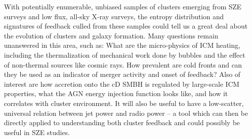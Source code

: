 \documentclass[11pt]{article}
\begin{document}
With potentially enumerable, unbiased samples of clusters emerging
from SZE surveys and low flux, all-sky X-ray surveys, the entropy
distribution and signatures of feedback culled from these samples
could tell us a great deal about the evolution of clusters and galaxy
formation. Many questions remain unanswered in this area, such as:
What are the micro-physics of ICM heating, including the
thermalization of mechanical work done by bubbles and the effect of
non-thermal sources like cosmic rays. How prevalent are cold fronts
and can they be used as an indicator of merger activity and onset of
feedback? Also of interest are how accretion onto the cD SMBH is
regulated by large-scale ICM properties, what the AGN energy injection
function looks like, and how it correlates with cluster
environment. It will also be useful to have a low-scatter, universal
relation between jet power and radio power -- a tool which can then be
directly applied to understanding both cluster feedback and could
possibly be useful in SZE studies.
\end{document}
